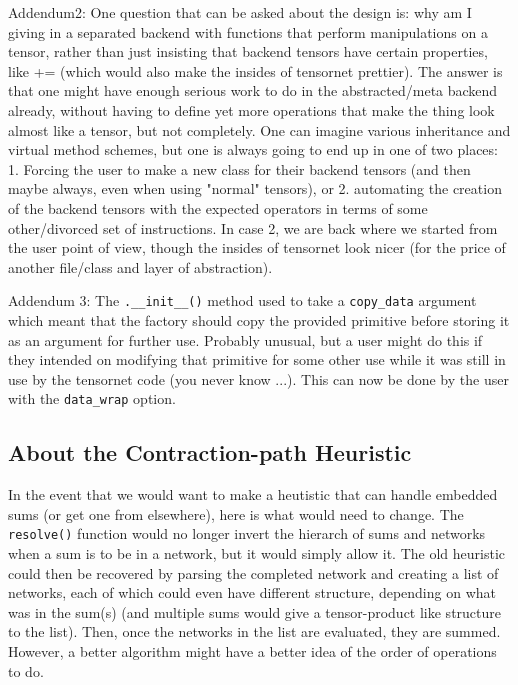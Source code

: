 \documentclass[12pt,letterpaper]{article}
\begin{document}
Addendum2:  One question that can be asked about the design is: why am I giving in a separated
backend with functions that perform manipulations on a tensor, rather than just insisting that backend
tensors have certain properties, like += (which would also make the insides of tensornet prettier).
The answer is that one might have enough serious work to do in the abstracted/meta backend already,
without having to define yet more operations that make the thing look almost like a tensor, but not
completely.  One can imagine various inheritance and virtual method schemes, but one is always going
to end up in one of two places: 1. Forcing the user to make a new class for their backend tensors
(and then maybe always, even when using "normal" tensors), or 2. automating the creation of the 
backend tensors with the expected operators in terms of some other/divorced set of instructions.
In case 2, we are back where we started from the user point of view, though the insides of tensornet
look nicer (for the price of another file/class and layer of abstraction).

Addendum 3: The \texttt{.\_\_init\_\_()} method used to take a \texttt{copy\_data} argument which meant that the factory should
copy the provided primitive before storing it as an argument for further use.  Probably unusual, but
a user might do this if they intended on modifying that primitive for some other use while it was still
in use by the tensornet code (you never know ...).  This can now be done by the user with the \texttt{data\_wrap}
option.

	\subsection{About the Contraction-path Heuristic}

In the event that we would want to make a heutistic that can handle embedded sums (or get one from elsewhere),
 here is what would need to change.
The \texttt{resolve()} function would no longer invert the hierarch of sums and networks when a sum is to
 be in a network, but it would simply allow it.
The old heuristic could then be recovered by parsing the completed network and creating a list of networks,
 each of which could even have different structure, depending on what was in the sum(s) (and multiple sums
 would give a tensor-product like structure to the list).  Then, once the networks in the list are evaluated,
 they are summed.
However, a better algorithm might have a better idea of the order of operations to do.
\end{document}
